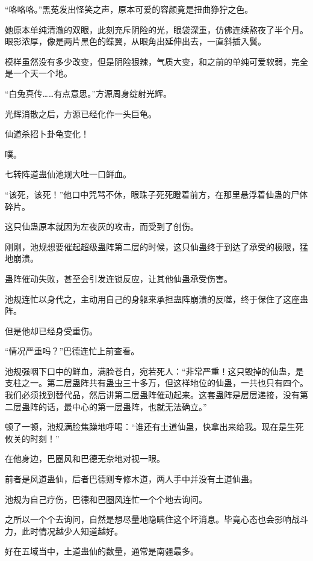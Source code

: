 
\begin{this_body}

“咯咯咯。”黑莬发出怪笑之声，原本可爱的容颜竟是扭曲狰狞之色。

她原本单纯清澈的双眼，此刻充斥阴险的光，眼袋深重，仿佛连续熬夜了半个月。眼影浓厚，像是两片黑色的蝶翼，从眼角出延伸出去，一直斜插入鬓。

模样虽然没有多少改变，但是阴险狠辣，气质大变，和之前的单纯可爱软弱，完全是一个天一个地。

“白兔真传……有点意思。”方源周身绽射光辉。

光辉消散之后，方源已经化作一头巨龟。

仙道杀招卜卦龟变化！

噗。

七转阵道蛊仙池规大吐一口鲜血。

“该死，该死！”他口中咒骂不休，眼珠子死死瞪着前方，在那里悬浮着仙蛊的尸体碎片。

这只仙蛊原本就因为左夜灰的攻击，而受到了创伤。

刚刚，池规想要催起超级蛊阵第二层的时候，这只仙蛊终于到达了承受的极限，猛地崩溃。

蛊阵催动失败，甚至会引发连锁反应，让其他仙蛊承受伤害。

池规连忙以身代之，主动用自己的身躯来承担蛊阵崩溃的反噬，终于保住了这座蛊阵。

但是他却已经身受重伤。

“情况严重吗？”巴德连忙上前查看。

池规强咽下口中的鲜血，满脸苍白，宛若死人：“非常严重！这只毁掉的仙蛊，是支柱之一。第二层蛊阵共有蛊虫三十多万，但这样地位的仙蛊，一共也只有四个。我们必须找到替代品，然后讲第二层蛊阵催动起来。这套蛊阵是层层递接，没有第二层蛊阵的话，最中心的第一层蛊阵，也就无法确立。”

顿了一顿，池规满脸焦躁地呼喝：“谁还有土道仙蛊，快拿出来给我。现在是生死攸关的时刻！”

在他身边，巴圈风和巴德无奈地对视一眼。

前者是风道蛊仙，后者巴德则专修木道，两人手中并没有土道仙蛊。

池规为自己疗伤，巴德和巴圈风连忙一个个地去询问。

之所以一个个去询问，自然是想尽量地隐瞒住这个坏消息。毕竟心态也会影响战斗力，此时情况越少人知道越好。

好在五域当中，土道蛊仙的数量，通常是南疆最多。


\end{this_body}
